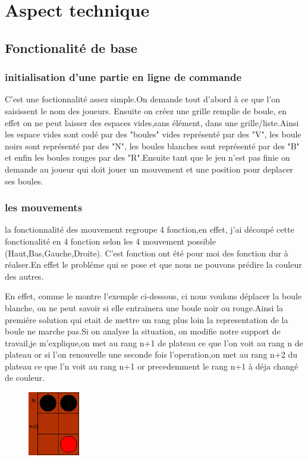 \documentclass{article}
\begin{document}
\section{Aspect technique}
\subsection{Fonctionalité de base}
\subsubsection{initialisation d'une partie en ligne de commande}
C'est une foctionnalité assez simple.On demande tout d'abord à ce que l'on saisissent le nom des joueurs. Ensuite on créez une grille remplie de boule, en effet on ne peut laisser des espaces vides,sans élément, dans une grille/liste.Ainsi les espace vides sont codé par des "boules" vides représenté par des "V", les boule noirs sont représenté par des "N", les boules blanches sont représenté par des "B" et enfin les boules rouges par des "R".Ensuite tant que le jeu n'est pas finie on demande au joueur qui doit jouer un mouvement et une position pour deplacer ses boules.
\newpage
\subsubsection{les mouvements}
 la fonctionnalité des mouvement regroupe 4 fonction,en effet, j'ai découpé cette fonctionalité en 4 fonction selon les 4 mouvement possible (Haut,Bas,Gauche,Droite). C'est fonction ont été pour moi des fonction dur à réalser.En effet le probléme qui se pose et que nous ne pouvons prédire la couleur des autres.

En effet, comme le montre l'exemple ci-dessous, ci nous voulons déplacer la boule blanche, on ne peut savoir si elle entrainera une boule noir ou rouge.Ainsi la premiére solution qui etait de mettre un rang plus loin la representation de la boule ne marche pas.Si on analyse la situation, on modifie notre support de travail,je m'explique,on met au rang n+1 de plateau ce que l'on voit au rang n de plateau or si l'on renouvelle une seconde fois l'operation,on met au rang n+2 du plateau ce que l'n voit au rang n+1 or precedemment le rang n+1 à déja changé de couleur.

\begin{figure}[!h]
\centerline{\includegraphics[width=0.2\textwidth]{images/fonctionalite_mouvement.png}}
\vspace{1cm}
\caption{}
\end{figure}
\end{document}
